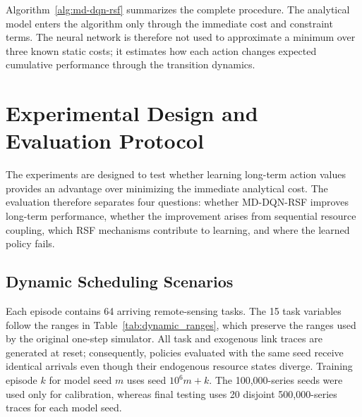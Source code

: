 \documentclass[lettersize,journal]{IEEEtran}
\begin{document}
Algorithm~\ref{alg:md-dqn-rsf} summarizes the complete procedure. The analytical model enters the algorithm only through the immediate cost and constraint terms. The neural network is therefore not used to approximate a minimum over three known static costs; it estimates how each action changes expected cumulative performance through the transition dynamics.




\section{Experimental Design and Evaluation Protocol}
\label{sec:experiments}

The experiments are designed to test whether learning long-term action values provides an advantage over minimizing the immediate analytical cost. The evaluation therefore separates four questions: whether MD-DQN-RSF improves long-term performance, whether the improvement arises from sequential resource coupling, which RSF mechanisms contribute to learning, and where the learned policy fails.

\subsection{Dynamic Scheduling Scenarios}

Each episode contains 64 arriving remote-sensing tasks. The 15 task variables follow the ranges in Table~\ref{tab:dynamic_ranges}, which preserve the ranges used by the original one-step simulator. All task and exogenous link traces are generated at reset; consequently, policies evaluated with the same seed receive identical arrivals even though their endogenous resource states diverge. Training episode $k$ for model seed $m$ uses seed $10^6m+k$. The 100,000-series seeds were used only for calibration, whereas final testing uses 20 disjoint 500,000-series traces for each model seed.

\begin{table}[t]
\centering
\caption{Task-variable ranges in each 64-step episode. All continuous variables are sampled uniformly before scenario-specific perturbations.}
\label{tab:dynamic_ranges}
\end{table}
\end{document}
